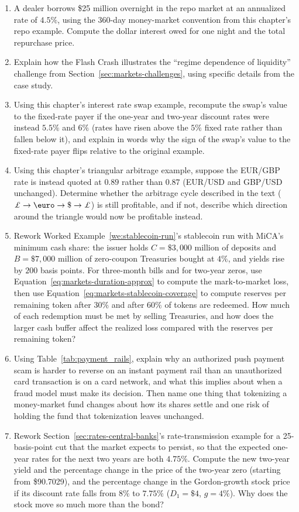 \documentclass[../ai_in_finance]{subfiles}
\begin{document}
\begin{enumerate}[exercises]
    \item A dealer borrows \$25 million overnight in the repo market at an annualized rate of $4.5\%$, using the 360-day money-market convention from this chapter's repo example. Compute the dollar interest owed for one night and the total repurchase price.
    \item Explain how the Flash Crash illustrates the ``regime dependence of liquidity'' challenge from Section~\ref{sec:markets-challenges}, using specific details from the case study.
    \item Using this chapter's interest rate swap example, recompute the swap's value to the fixed-rate payer if the one-year and two-year discount rates were instead $5.5\%$ and $6\%$ (rates have risen above the $5\%$ fixed rate rather than fallen below it), and explain in words why the sign of the swap's value to the fixed-rate payer flips relative to the original example.
    \item Using this chapter's triangular arbitrage example, suppose the EUR/GBP rate is instead quoted at $0.89$ rather than $0.87$ (EUR/USD and GBP/USD unchanged). Determine whether the arbitrage cycle described in the text ($\pounds \to \text{\euro} \to \$ \to \pounds$) is still profitable, and if not, describe which direction around the triangle would now be profitable instead.
    \item Rework Worked Example~\ref{we:stablecoin-run}'s stablecoin run with MiCA's minimum cash share: the issuer holds $C = \$3{,}000$ million of deposits and $B = \$7{,}000$ million of zero-coupon Treasuries bought at $4\%$, and yields rise by $200$ basis points. For three-month bills and for two-year zeros, use Equation~\eqref{eq:markets-duration-approx} to compute the mark-to-market loss, then use Equation~\eqref{eq:markets-stablecoin-coverage} to compute reserves per remaining token after $30\%$ and after $60\%$ of tokens are redeemed. How much of each redemption must be met by selling Treasuries, and how does the larger cash buffer affect the realized loss compared with the reserves per remaining token?
    \item Using Table~\ref{tab:payment_rails}, explain why an authorized push payment scam is harder to reverse on an instant payment rail than an unauthorized card transaction is on a card network, and what this implies about when a fraud model must make its decision. Then name one thing that tokenizing a money-market fund changes about how its shares settle and one risk of holding the fund that tokenization leaves unchanged.
    \item Rework Section~\ref{sec:rates-central-banks}'s rate-transmission example for a 25-basis-point cut that the market expects to persist, so that the expected one-year rates for the next two years are both $4.75\%$. Compute the new two-year yield and the percentage change in the price of the two-year zero (starting from \$90.7029), and the percentage change in the Gordon-growth stock price if its discount rate falls from $8\%$ to $7.75\%$ ($D_1=\$4$, $g=4\%$). Why does the stock move so much more than the bond?

\end{enumerate}
\end{document}
